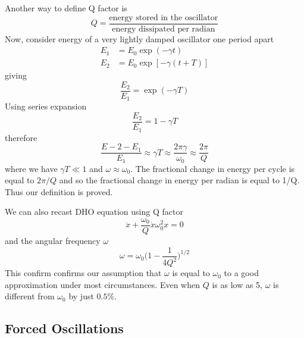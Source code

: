 \documentclass[../main.tex]{subfiles}
\begin{document}
Another way to define Q factor is 
\begin{equation*}
    Q=\frac{\text{energy stored in the oscillator}}{\text{energy dissipated per radian}}
\end{equation*}
Now, consider energy of a very lightly damped oscillator one period apart 
\begin{align*}
    E_1&=E_0\exp(-\gamma t) \\
    E_2&=E_0\exp[-\gamma (t+T)]
\end{align*}
giving
\begin{equation*}
    \frac{E_2}{E_1}=\exp(-\gamma T)
\end{equation*}
Using series expansion
\begin{equation*}
    \frac{E_2}{E_1}=1-\gamma T
\end{equation*}
therefore
\begin{equation*}
    \frac{E-2-E_1}{E_1}\approx\gamma T\approx\frac{2\pi\gamma}{\omega_0}\approx\frac{2\pi}{Q}
\end{equation*}
where we have $\gamma T\ll 1$ and $\omega\approx\omega_0$. The fractional change in energy per cycle is equal to $2\pi/Q$ and so the fractional change in energy per radian is equal to 1/Q. Thus our definition is proved.

We can also recast DHO equation using Q factor
\begin{equation*}
    \ddot{x}+\frac{\omega_0}{Q}\dot{x}\omega_0^2x=0
\end{equation*}
and the angular frequency $\omega$
\begin{equation*}
    \omega =\omega_0\biggl(1-\frac{1}{4Q^2}\biggr)^{1/2}
\end{equation*}
This confirm confirms our assumption that $\omega$ is equal to $\omega_0$ to a good approximation under most circumstances. Even when $Q$ is as low as 5, $\omega$ is different from $\omega_0$ by just $0.5\%$.

\subsection*{Forced Oscillations}
\end{document}
